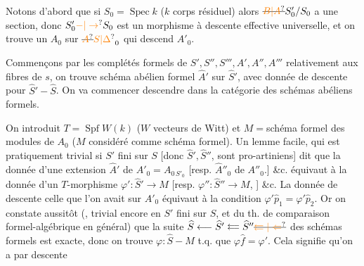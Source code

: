Notons d'abord que si $S_0=\operatorname{Spec} k$ ($k$ corps résiduel) alors $\deleted{\unsure{B|A}}S'_0/S_0$ a une section, donc $S'_0\unsure{-|\to}S_0$ est un morphisme à descente effective universelle, et on trouve un $A_0$ sur $\deleted{\unsure{A}}\unsure{S|\Delta}_0$ qui descend $A'_0$.

Commençons par  les complétés formels de $S',S'',S''',A',A'',A'''$  relativement aux fibres de $s$, on trouve  schéma abélien formel $\widehat A'$ sur $\widehat S'$, avec donnée de descente pour $\widehat S'-\widehat S$. On va commencer  descendre dans la catégorie des schémas abéliens formels.

On introduit $T=\operatorname{Spf} W(k)$ ($W$ vecteurs de Witt) et $M={}$schéma formel des modules de $A_0$ ($M$ considéré comme schéma formel). Un lemme facile, qui est pratiquement trivial si $S'$ fini sur $S$ [donc $\widehat S',\widehat S''$,  sont pro-artiniens] dit que la donnée d'une extension  $\widehat A'$ de $A'_0=A_{0\,S'_0}$ [resp. $\widehat A''_0$ de $A''_0$.] \&c. équivaut à la donnée d'un $T$-morphisme $\varphi':\widehat S'\to M$ [resp. $\varphi'':\widehat S''\to M$, ] \&c. La donnée de descente   celle que l'on avait sur $A'_0$ équivaut à la condition $\varphi'\widehat p_1=\varphi'\widehat p_2$. Or on constate aussitôt (, trivial encore en  $S'$ fini sur $S$, et  du th. de comparaison formel-algébrique en général) que la suite $\widehat S\longleftarrow\widehat S'\mathrel{\substack{\longleftarrow\\[-.6ex]\longleftarrow}}\widehat S''\deleted{\unsure{\leftleftarrows|\Leftarrow}}$ des schémas formels est exacte, donc on trouve $\varphi:\widehat S-M$ t.q. que $\varphi\widehat f=\varphi'$. Cela signifie qu'on a par descente

